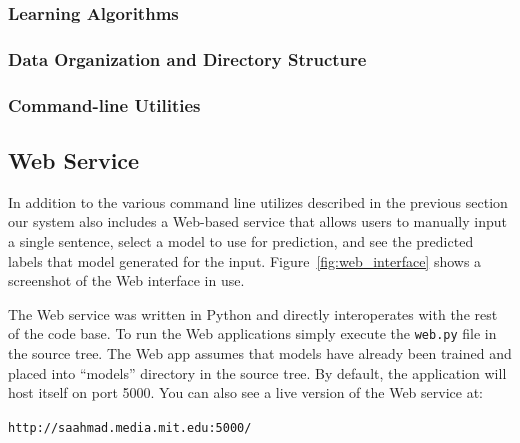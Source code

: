 \documentclass[preprint]{style}
\begin{document}
\subsubsection{Learning Algorithms}

\subsubsection{Data Organization and Directory Structure}

\subsubsection{Command-line Utilities}

\subsection{Web Service}

In addition to the various command line utilizes described in the previous section our system also includes a Web-based service that allows users to manually input a single sentence, select a model to use for prediction, and see the predicted labels that model generated for the input. Figure~\ref{fig:web_interface} shows a screenshot of the Web interface in use.

The Web service was written in Python and directly interoperates with the rest of the code base. To run the Web applications simply execute the {\tt web.py} file in the source tree. The Web app assumes that models have already been trained and placed into ``models'' directory in the source tree. By default, the application will host itself on port 5000. You can also see a live version of the Web service at:

{\tt http://saahmad.media.mit.edu:5000/ }
\end{document}
